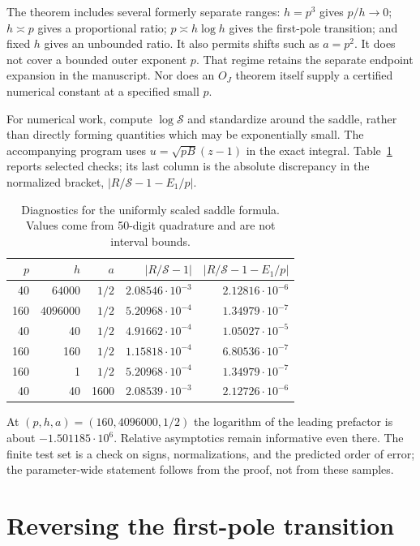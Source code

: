 \documentclass[11pt,a4paper]{article}
\numberwithin{equation}{section}
\theoremstyle{plain}
\theoremstyle{definition}
\theoremstyle{remark}
\begin{document}
The theorem includes several formerly separate ranges:
$h=p^3$ gives $p/h\to0$; $h\asymp p$ gives a proportional
ratio; $p\asymp h\log h$ gives the first-pole transition; and fixed
$h$ gives an unbounded ratio. It also permits shifts such as
$a=p^2$. It does not cover a bounded outer exponent $p$. That
regime retains the separate endpoint expansion in the manuscript.
Nor does an $O_J$ theorem itself supply a certified numerical
constant at a specified small $p$.

For numerical work, compute $\log\mathcal S$ and standardize around
the saddle, rather than directly forming quantities which may be
exponentially small. The accompanying program uses
$u=\sqrt{pB}(z-1)$ in the exact integral. Table~\ref{us:tab:saddle}
reports selected checks; its last column is the absolute discrepancy
in the normalized bracket, $|R/\mathcal S-1-E_1/p|$.

\begin{table}[htbp]
\centering
\caption{Diagnostics for the uniformly scaled saddle formula.
Values come from 50-digit quadrature and are not interval bounds.}
\label{us:tab:saddle}
\begin{tabular}{@{}rrrrr@{}}
\toprule
$p$ & $h$ & $a$ & $|R/\mathcal S-1|$ & $|R/\mathcal S-1-E_1/p|$\\
\midrule
40 & $64000$ & $1/2$ & $2.08546\cdot10^{-3}$ & $2.12816\cdot10^{-6}$\\
160 & $4096000$ & $1/2$ & $5.20968\cdot10^{-4}$ & $1.34979\cdot10^{-7}$\\
40 & 40 & $1/2$ & $4.91662\cdot10^{-4}$ & $1.05027\cdot10^{-5}$\\
160 & 160 & $1/2$ & $1.15818\cdot10^{-4}$ & $6.80536\cdot10^{-7}$\\
160 & 1 & $1/2$ & $5.20968\cdot10^{-4}$ & $1.34979\cdot10^{-7}$\\
40 & 40 & 1600 & $2.08539\cdot10^{-3}$ & $2.12726\cdot10^{-6}$\\
\bottomrule
\end{tabular}
\end{table}

At $(p,h,a)=(160,4096000,1/2)$ the logarithm of the leading
prefactor is about $-1.501185\cdot10^6$. Relative asymptotics remain
informative even there. The finite test set is a check on signs,
normalizations, and the predicted order of error; the parameter-wide
statement follows from the proof, not from these samples.


\section{Reversing the first-pole transition}
\label{us:sec:inverse}
\end{document}
